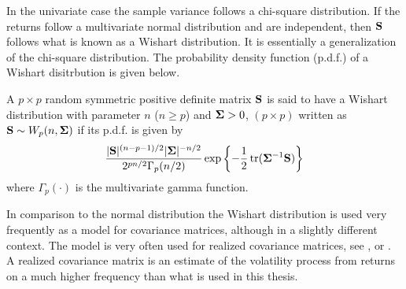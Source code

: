 \documentclass[12pt, oneside]{book}\usepackage{knitr}
\begin{document}
{In the univariate case the sample variance follows a chi-square distribution. 
If the returns follow a multivariate normal distribution and are independent, then $\mathbf{S}$ follows what is known as a Wishart distribution. 
It is essentially a generalization of the chi-square distribution. 
The probability density function (p.d.f.) of a Wishart disitrbution is given below.
\begin{definition}\label{def:wishart}
	A $p\times p$ random symmetric positive definite matrix $\mathbf{S}$ is said to have a Wishart distribution with parameter $n$ ($n\geq p$) and $\mathbf{\Sigma} > 0$, $(p \times p)$ written as $\mathbf{S} \sim W_p(n, \mathbf{\Sigma})$ if its p.d.f. is given by
	\begin{equation}\label{eqn:wishart_density}
  	\frac{|\mathbf{S}|^{(n-p-1)/2} |\mathbf{\Sigma}|^{- n/2} }{2^{pn/2} \Gamma_p (n/2) } \exp\left\{-\frac{1}{2} \operatorname{tr}(\mathbf{\Sigma}^{-1}\mathbf{S})  \right\}
	\end{equation}
	where $ \Gamma_p (\cdot) $ is the multivariate gamma function.
\end{definition}
In comparison to the normal distribution the Wishart distribution is used very frequently as a model for covariance matrices, although in a slightly different context.
The model is very often used for realized covariance matrices, see \citet{barndorff2004econometric}, \citet{golosnoy2019exponential} or \citet{alfelt2021modeling}.
A realized covariance matrix is an estimate of the volatility process from returns on a much higher frequency than what is used in this thesis.

}
\end{document}
